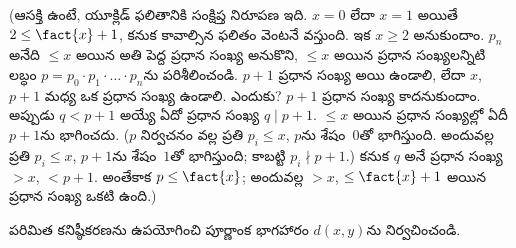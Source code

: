 \documentclass[../../../include/open-logic-section]{subfiles}
\begin{document}
(ఆసక్తి ఉంటే, యూక్లిడ్ ఫలితానికి సంక్షిప్త నిరూపణ ఇది. $x=0$ లేదా
$x=1$ అయితే $2\leq\fact{x}+1$, కనుక కావాల్సిన ఫలితం వెంటనే వస్తుంది.
ఇక $x\geq2$ అనుకుందాం. $p_n$ అనేది $\le x$ అయిన అతి పెద్ద ప్రధాన
సంఖ్య అనుకొని, $\le x$ అయిన ప్రధాన సంఖ్యలన్నిటి లబ్ధం
$p=p_0\cdot p_1\cdot\dots\cdot p_n$ను పరిశీలించండి. $p+1$ ప్రధాన
సంఖ్య అయి ఉండాలి, లేదా $x$, $p+1$ మధ్య ఒక ప్రధాన సంఖ్య ఉండాలి. ఎందుకు?
$p+1$ ప్రధాన సంఖ్య కాదనుకుందాం. అప్పుడు $q<p+1$ అయ్యే ఏదో ప్రధాన
సంఖ్య $q\mid p+1$. $\le x$ అయిన ప్రధాన సంఖ్యల్లో ఏదీ $p+1$ను
భాగించదు. ($p$ నిర్వచనం వల్ల ప్రతి $p_i\le x$, $p$ను శేషం~$0$తో
భాగిస్తుంది. అందువల్ల ప్రతి $p_i\le x$, $p+1$ను శేషం~$1$తో
భాగిస్తుంది; కాబట్టి $p_i\nmid p+1$.) కనుక $q$ అనే ప్రధాన సంఖ్య
$>x$, $<p+1$. అంతేకాక $p\le\fact{x}$; అందువల్ల $>x$, $\le
\fact{x}+1$ అయిన ప్రధాన సంఖ్య ఒకటి ఉంది.)

\begin{prob}
పరిమిత కనిష్ఠీకరణను ఉపయోగించి పూర్ణాంక భాగహారం $d(x,y)$ను
నిర్వచించండి.
\end{prob}
\end{document}

